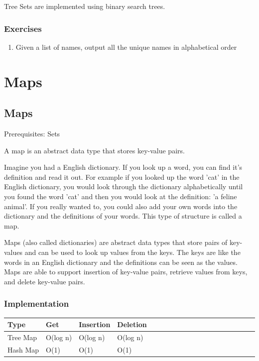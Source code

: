 \documentclass[11pt,oneside]{book}
\begin{document}
Tree Sets are implemented using binary search trees.

\subsection{Exercises}

\begin{enumerate}
\item Given a list of names, output all the unique names in alphabetical order
\end{enumerate}

    \chapter{ Maps }
        \section{ Maps }
        

Prerequisites: Sets

A map is an abstract data type that stores key-value pairs.

Imagine you had a English dictionary. If you look up a word, you can find it's definition and read it out. For example if you looked up the word 'cat' in the English dictionary, you would look through the dictionary alphabetically until you found the word 'cat' and then you would look at the definition: 'a feline animal'. If you really wanted to, you could also add your own words into the dictionary and the definitions of your words. This type of structure is called a map.

Maps (also called dictionaries) are abstract data types that store pairs of key-values and can be used to look up values from the keys. The keys are like the words in an English dictionary and the definitions can be seen as the values. Maps are able to support insertion of key-value pairs, retrieve values from keys, and delete key-value pairs.

\subsection{Implementation}

\vspace{10px}\begin{tabulary}{0.4\linewidth}{|l|l|l|l|l|l|l|l|l|l|l|l|l|l|l|l|l|l|l}\hline


  Type &
  Get &
  Insertion &
  Deletion\\
\hline


  Tree Map &
  O(log n) &
  O(log n) &
  O(log n)\\

  Hash Map &
  O(1) &
  O(1) &
  O(1)\\

\hline\end{tabulary}
\end{document}
